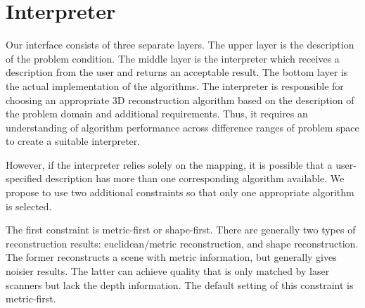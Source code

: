


\section{Interpreter}
\label{sec:interp}
Our interface consists of three separate layers. The upper layer is the description of the problem condition. The middle layer is the interpreter which receives a description from the user and returns an acceptable result. The bottom layer is the actual implementation of the algorithms. The interpreter is responsible for choosing an appropriate 3D reconstruction algorithm based on the description of the problem domain and additional requirements. Thus, it requires an understanding of algorithm performance across difference ranges of problem space to create a suitable interpreter.

However, if the interpreter relies solely on the mapping, it is possible that a user-specified description has more than one corresponding algorithm available. We propose to use two additional constraints so that only one appropriate algorithm is selected.

The first constraint is metric-first or shape-first. There are generally two types of reconstruction results: euclidean/metric reconstruction, and shape reconstruction. The former reconstructs a scene with metric information, but generally gives noisier results. The latter can achieve quality that is only matched by laser scanners but lack the depth information. The default setting of this constraint is metric-first.

